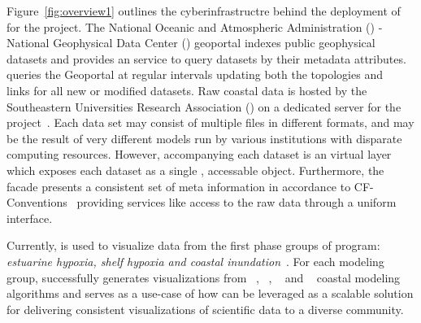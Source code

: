 Figure~\ref{fig:overview1} outlines the cyberinfrastructre behind the
deployment of \sciwms{} for the \comt{} project. The National Oceanic
and Atmospheric Administration (\noaa{}) - National Geophysical Data
Center (\ngdc{}) geoportal indexes public geophysical datasets and
provides an \ogc{} \csw{} service to query datasets by their metadata
attributes. \sciwms{} queries the \ngdc{} Geoportal at regular
intervals updating both the topologies and
\opendap{}~\cite{Cornillon03} links for all new or modified datasets.
Raw coastal data is hosted by the Southeastern Universities Research
Association (\sura{}) on a dedicated server for the \comt{}
project~\cite{luettich12}. Each data set may consist of multiple files
in different formats, and may be the result of very different models
run by various institutions with disparate computing
resources. However, accompanying each dataset is an \ncml{} virtual
layer which exposes each dataset as a single \netcdf{}, \opendap{}
accessable object. Furthermore, the \ncml{} facade presents a
consistent set of meta information in accordance to
CF-Conventions~\cite{cf} providing services like \sciwms{} access to
the raw data through a uniform interface.

Currently, \Sciwms{} is used to visualize data from the first phase
groups of \ioos{} \comt{} program: {\em estuarine hypoxia, shelf
  hypoxia and coastal inundation}~\cite{luettich13}. For each modeling
group, \sciwms{} successfully generates visualizations from
\adcirc{}~\cite{adcirc}, \fvcom{}~\cite{chen06}, \selfe{}~\cite{zhang08} and \slosh{}~\cite{chen84} coastal
modeling algorithms and serves as a use-case of how \sciwms{} can be
leveraged as a scalable solution for delivering consistent
visualizations of scientific data to a diverse community.
